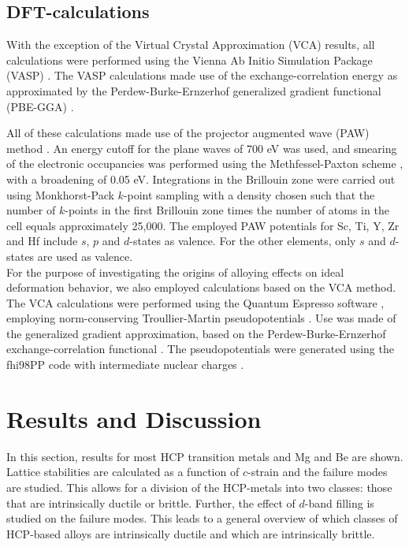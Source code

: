 \documentclass[showpacs,aps,floatfix,prb,reprint,superscriptaddress]{revtex4-1}
\begin{document}
\subsection{DFT-calculations}
With the exception of the Virtual Crystal Approximation (VCA) results, all calculations were performed using the Vienna Ab Initio Simulation Package (VASP) \cite{PhysRevB.54.11169,PhysRevB.47.558}. The VASP calculations made use of the exchange-correlation energy as approximated by the Perdew-Burke-Ernzerhof generalized gradient functional (PBE-GGA) \cite{PhysRevLett.77.3865}.

All of these calculations made use of the projector augmented wave (PAW) method \cite{PhysRevB.50.17953,PhysRevB.59.1758}.  An energy cutoff for the plane waves of 700 eV was used, and smearing of the electronic occupancies was performed using the Methfessel-Paxton scheme \cite{PhysRevB.40.3616}, with a broadening of 0.05 eV.  Integrations in the Brillouin zone were carried out using Monkhorst-Pack $k$-point sampling \cite{PhysRevB.13.5188} with a density chosen such that the number of $k$-points in the first Brillouin zone times the number of atoms in the cell equals approximately 25,000. The employed PAW potentials for Sc, Ti, Y, Zr and Hf include $s$, $p$ and $d$-states as valence. For the other elements, only $s$ and $d$-states are used as valence. \\

For the purpose of investigating the origins of alloying effects on ideal deformation behavior, we also employed calculations based on the VCA  method. The VCA calculations were performed using the Quantum Espresso software \cite{giannozzi2009quantum}, employing norm-conserving Troullier-Martin pseudopotentials \cite{troullier1991efficient,romaner2010effect}. Use was made of the generalized gradient approximation, based on the Perdew-Burke-Ernzerhof exchange-correlation functional \cite{PhysRevLett.77.3865}. The pseudopotentials were generated using the fhi98PP code with intermediate nuclear charges \cite{fuchs1999ab}. 



\section{Results and Discussion}
In this section, results for most HCP transition metals and Mg and Be are shown. Lattice stabilities are calculated as a function of $c$-strain and the failure modes are studied. This allows for a division of the HCP-metals into two classes: those that are intrinsically ductile or brittle. Further, the effect of $d$-band filling is studied on the failure modes. This leads to a general overview of which classes of HCP-based alloys are intrinsically ductile and which are intrinsically brittle.
\end{document}
